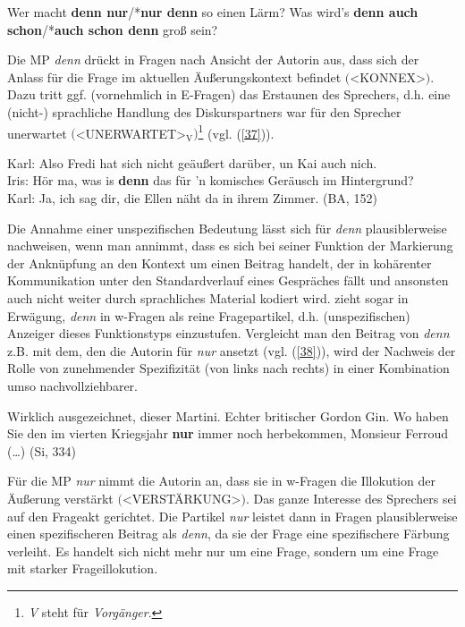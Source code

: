 \begin{exe}
	\ex\label{36} 
		\begin{xlist}	
			\ex\label{36a} Wer macht \textbf{denn nur}/*\textbf{nur denn} so einen Lärm?
			\ex\label{36b} Was wird’s \textbf{denn auch schon}/*\textbf{auch schon denn} groß sein?
		\end{xlist}
	\hfill\hbox{\citet[29]{Thurmair1991}}	
\end{exe}
Die MP \textit{denn} drückt in Fragen nach Ansicht der Autorin aus, dass sich der Anlass für die Frage im aktuellen Äußerungskontext befindet $($<KONNEX>$)$. Dazu tritt ggf. (vornehmlich in E-Fragen) das Erstaunen des Sprechers, d.h. eine (nicht-) \linebreak sprachliche Handlung des Diskurspartners war für den Sprecher unerwar\-tet \linebreak $($<UNERWARTET>$_{\textrm{V}})$\footnote{\textit{V} steht für \textit{Vorgänger}.} (vgl. (\ref{37})).

\begin{exe}
	\ex\label{37} 
			Karl: Also Fredi hat sich nicht geäußert darüber, un Kai auch nich.\\
			Iris: Hör ma, was is \textbf{denn} das für 'n komisches Geräusch im Hintergrund?\\
			Karl: Ja, ich sag dir, die Ellen näht da in ihrem Zimmer. (BA, 152)
			\newline
			\hbox{}\hfill\hbox{\citet[166]{Thurmair1989}}	
\end{exe}
Die Annahme einer unspezifischen Bedeutung lässt sich für \textit{denn} plausiblerweise nachweisen, wenn man annimmt, dass es sich bei seiner Funktion der Markierung der Anknüpfung an den Kontext um einen Beitrag handelt, der in kohärenter Kommunikation unter den Standardverlauf eines Gespräches fällt und ansonsten auch nicht weiter durch sprachliches Material kodiert wird. \citet[170]{Thurmair1989} zieht sogar in Erwägung, \textit{denn} in w-Fragen  als reine Fragepartikel, d.h. (unspezifischen) Anzeiger dieses Funktionstyps einzustufen. Vergleicht man den Beitrag von \textit{denn} z.B. mit dem, den die Autorin für \textit{nur} ansetzt (vgl. (\ref{38})), wird der Nachweis der Rolle von zunehmender Spezifizität (von links nach rechts) in einer Kombination umso nachvollziehbarer.

\begin{exe}
	\ex\label{38} 
		\glqq Wirklich ausgezeichnet, dieser Martini. Echter britischer Gordon Gin. Wo haben Sie den im vierten Kriegsjahr \textbf{nur} immer noch herbekommen, Monsieur Ferroud (\ldots)\grqq{} (Si, 334) 			
	\hfill\hbox{\citet[179]{Thurmair1989}}	
\end{exe}
Für die MP \textit{nur} nimmt die Autorin an, dass sie in w-Fragen die Illokution der Äußerung verstärkt $($<VERST\"ARKUNG>$)$. Das ganze Interesse des Sprechers sei auf den Frageakt gerichtet. Die Partikel \textit{nur} leistet dann in Fragen  plausiblerweise einen spezifischeren Beitrag als \textit{denn}, da sie der Frage eine spezifischere Färbung verleiht. Es handelt sich nicht mehr nur um eine Frage, sondern um eine Frage mit starker Frageillokution.

